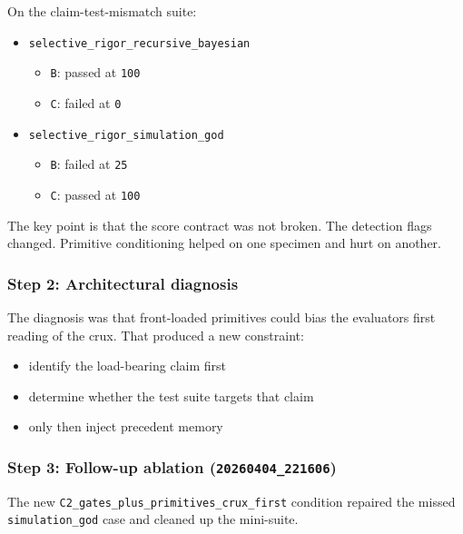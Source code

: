 \documentclass[
]{article}
\providecommand{\tightlist}{%
  \setlength{\itemsep}{0pt}\setlength{\parskip}{0pt}}
\begin{document}
On the claim-test-mismatch suite:

\begin{itemize}
\tightlist
\item
  \texttt{selective\_rigor\_recursive\_bayesian}

  \begin{itemize}
  \tightlist
  \item
    \texttt{B}: passed at \texttt{100}
  \item
    \texttt{C}: failed at \texttt{0}
  \end{itemize}
\item
  \texttt{selective\_rigor\_simulation\_god}

  \begin{itemize}
  \tightlist
  \item
    \texttt{B}: failed at \texttt{25}
  \item
    \texttt{C}: passed at \texttt{100}
  \end{itemize}
\end{itemize}

The key point is that the score contract was not broken. The detection
flags changed. Primitive conditioning helped on one specimen and hurt on
another.

\subsubsection{Step 2: Architectural
diagnosis}\label{step-2-architectural-diagnosis}

The diagnosis was that front-loaded primitives could bias the
evaluator\textquotesingle s first reading of the crux. That produced a
new constraint:

\begin{itemize}
\tightlist
\item
  identify the load-bearing claim first
\item
  determine whether the test suite targets that claim
\item
  only then inject precedent memory
\end{itemize}

\subsubsection{\texorpdfstring{Step 3: Follow-up ablation
(\texttt{20260404\_221606})}{Step 3: Follow-up ablation (20260404\_221606)}}\label{step-3-follow-up-ablation-20260404_221606}

The new \texttt{C2\_gates\_plus\_primitives\_crux\_first} condition
repaired the missed \texttt{simulation\_god} case and cleaned up the
mini-suite.
\end{document}

